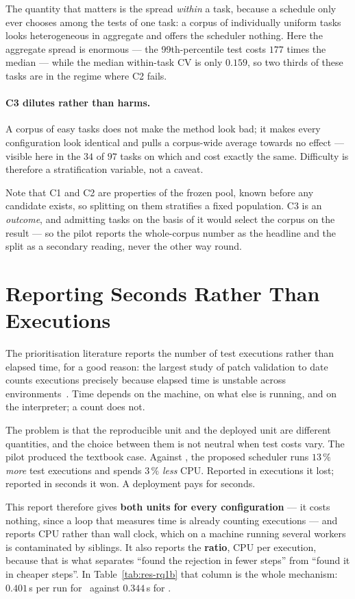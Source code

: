 The quantity that matters is the spread \emph{within} a task, because a
schedule only ever chooses among the tests of one task: a corpus of
individually uniform tasks looks heterogeneous in aggregate and offers the
scheduler nothing. Here the aggregate spread is enormous --- the
99th-percentile test costs $177$ times the median --- while the median
within-task CV is only $0.159$, so two thirds of these tasks are in the regime
where C2 fails.

\paragraph{C3 dilutes rather than harms.} A corpus of easy tasks does not make
the method look bad; it makes every configuration look identical and pulls a
corpus-wide average towards no effect --- visible here in the $34$ of $97$
tasks on which  and  cost exactly the same. Difficulty
is therefore a stratification variable, not a caveat.

Note that C1 and C2 are properties of the frozen pool, known before any
candidate exists, so splitting on them stratifies a fixed population. C3 is an
\emph{outcome}, and admitting tasks on the basis of it would select the corpus
on the result --- so the pilot reports the whole-corpus number as the headline
and the split as a secondary reading, never the other way round.

\section{Reporting Seconds Rather Than Executions}
\label{sec:disc-units}

The prioritisation literature reports the number of test executions rather than
elapsed time, for a good reason: the largest study of patch validation to date
counts executions precisely because elapsed time is unstable across
environments~\citep{lou2024aprregression}. Time depends on the machine, on what
else is running, and on the interpreter; a count does not.

The problem is that the reproducible unit and the deployed unit are different
quantities, and the choice between them is not neutral when test costs vary.
The pilot produced the textbook case. Against \frtp, the proposed scheduler
runs $13\,\%$ \emph{more} test executions and spends $3\,\%$ \emph{less} CPU.
Reported in executions it lost; reported in seconds it won. A deployment pays
for seconds.

This report therefore gives \textbf{both units for every configuration} --- it
costs nothing, since a loop that measures time is already counting executions
--- and reports CPU rather than wall clock, which on a machine running several
workers is contaminated by siblings. It also reports the \textbf{ratio}, CPU
per execution, because that is what separates ``found the rejection in fewer
steps'' from ``found it in cheaper steps''. In Table~\ref{tab:res-rq1b} that
column is the whole mechanism: $0.401$\,s per run for \frtp\ against $0.344$\,s
for .

